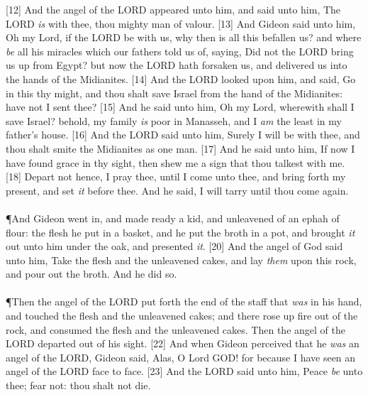 [12] \textcolor[cmyk]{0.99998,1,0,0}{And the angel of the LORD appeared unto him, and said unto him, The LORD \emph{is} with thee, thou mighty man of valour.}
[13] \textcolor[cmyk]{0.99998,1,0,0}{And Gideon said unto him, Oh my Lord, if the LORD be with us, why then is all this befallen us? and where \emph{be} all his miracles which our fathers told us of, saying, Did not the LORD bring us up from Egypt? but now the LORD hath forsaken us, and delivered us into the hands of the Midianites.}
[14] \textcolor[cmyk]{0.99998,1,0,0}{And the LORD looked upon him, and said, Go in this thy might, and thou shalt save Israel from the hand of the Midianites: have not I sent thee?}
[15] \textcolor[cmyk]{0.99998,1,0,0}{And he said unto him, Oh my Lord, wherewith shall I save Israel? behold, my family \emph{is} poor in Manasseh, and I \emph{am} the least in my father's house.}
[16] \textcolor[cmyk]{0.99998,1,0,0}{And the LORD said unto him, Surely I will be with thee, and thou shalt smite the Midianites as one man.}
[17] \textcolor[cmyk]{0.99998,1,0,0}{And he said unto him, If now I have found grace in thy sight, then shew me a sign that thou talkest with me.}
[18] \textcolor[cmyk]{0.99998,1,0,0}{Depart not hence, I pray thee, until I come unto thee, and bring forth my present, and set \emph{it} before thee. And he said, I will tarry until thou come again.}\\
\\
\P \textcolor[cmyk]{0.99998,1,0,0}{And Gideon went in, and made ready a kid, and unleavened  of an ephah of flour: the flesh he put in a basket, and he put the broth in a pot, and brought \emph{it} out unto him under the oak, and presented \emph{it}.}
[20] \textcolor[cmyk]{0.99998,1,0,0}{And the angel of God said unto him, Take the flesh and the unleavened cakes, and lay \emph{them} upon this rock, and pour out the broth. And he did so.}\\
\\
\P \textcolor[cmyk]{0.99998,1,0,0}{Then the angel of the LORD put forth the end of the staff that \emph{was} in his hand, and touched the flesh and the unleavened cakes; and there rose up fire out of the rock, and consumed the flesh and the unleavened cakes. Then the angel of the LORD departed out of his sight.}
[22] \textcolor[cmyk]{0.99998,1,0,0}{And when Gideon perceived that he \emph{was} an angel of the LORD, Gideon said, Alas, O Lord GOD! for because I have seen an angel of the LORD face to face.}
[23] \textcolor[cmyk]{0.99998,1,0,0}{And the LORD said unto him, Peace \emph{be} unto thee; fear not: thou shalt not die.}
